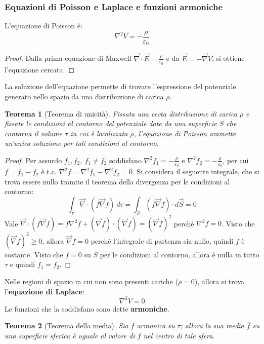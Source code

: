\documentclass[10pt, a4paper]{scrartcl}
\numberwithin{equation}{subsection}
\theoremstyle{style1}
\newtheorem{teorema}{Teorema}[section]
\newenvironment{boxenv}[1][]{
    \begin{eqbox}[#1]
    }{
   \end{eqbox}
}
\begin{document}
\subsubsection{Equazioni di Poisson e Laplace e funzioni armoniche}
L'equazione di Poisson \`e:
\begin{equation}
	\nabla ^2 V = -\frac{\rho }{\varepsilon _0}
\end{equation}
\begin{boxenv}[]
\begin{proof}
	Dalla prima equazione di Maxwell $\vec{\nabla }\cdot \vec{E} = \frac{\rho }{\varepsilon _0}$ e da $\vec{E}= - \vec{\nabla }V$, si ottiene l'equazione cercata.
\end{proof}
\end{boxenv}
\noindent La soluzione dell'equazione permette di trovare l'espressione del potenziale generato nello spazio da una distribuzione di carica $\rho $.
\begin{teorema}
	[Teorema di unicit\`a]
Fissata una certa distribuzione di carica $\rho $ e fissate le condizioni al contorno del potenziale date da una superficie $S$ che contorna il volume $\tau $ in cui \`e localizzata $\rho $, l'equazione di Poisson ammette un'unica soluzione per tali condizioni al contorno.
\end{teorema}
\begin{boxenv}[]
\begin{proof}
	Per assurdo $f_1,f_2, \ f_1\neq f_2$ soddisfano $\nabla ^2 f_1 = - \frac{\rho}{\varepsilon _0}$ e $\nabla ^2 f_2 = - \frac{\rho }{\varepsilon _0}$, per cui $f=f_1-f_2$ \`e t.c. $\nabla ^2 f = \nabla ^2 f_1 - \nabla ^2 f_2=0$. Si considera il seguente integrale, che si trova essere nullo tramite il teorema della divergenza per le condizioni al contorno:
	\[
	\int_{\tau } \vec{\nabla }\cdot  (f\vec{\nabla }f) \ d\tau = \int_{S}  (f\vec{\nabla }f) \cdot d\vec{S} = 0
	\] 
	Vale $\vec{\nabla }\cdot  (f\vec{\nabla }f) = f \nabla ^2 f + (\vec{\nabla }f) \cdot (\vec{\nabla }f)=(\vec{\nabla  }f)^2$ perch\'e $\nabla^2 f =0$. Visto che $(\vec{\nabla }f)^2\ge 0$, allora $\vec{\nabla }f=0$ perch\'e l'integrale di partenza sia nullo, quindi $f$ \`e costante. Visto che $f=0$ su $S$ per le condizioni al contorno, allora \`e nulla in tutto $\tau $ e quindi $f_1=f_2$.
\end{proof}
\end{boxenv}
\noindent Nelle regioni di spazio in cui non sono presenti cariche ($\rho =0$), allora si trova l'\textbf{equazione di Laplace}:
\begin{equation}
	\nabla ^2 V = 0
\end{equation}
Le funzioni che la soddisfano sono dette \textbf{armoniche}.
\begin{teorema}
	[Teorema della media]
	Sia $f$ armonica su $\tau $; allora la sua media $\overline{f}$ su una superficie sferica \`e uguale al valore di $f$ nel centro di tale sfera.
\end{teorema}
\end{document}
